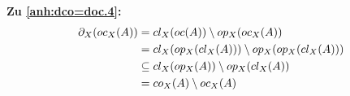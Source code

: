\noindent
\textbf{Zu \ref{anh:dco=doc.4}:}
	\begin{align*}
		\partial_X(oc_X(A)) &= cl_X(oc(A)) \setminus op_X(oc_X(A)) \\
		&= cl_X(op_X(cl_X(A))) \setminus op_X(op_X(cl_X(A))) \\
		&\subseteq cl_X(op_X(A)) \setminus op_X(cl_X(A)) \\
		& = co_X(A) \setminus oc_X(A)
	\end{align*}




